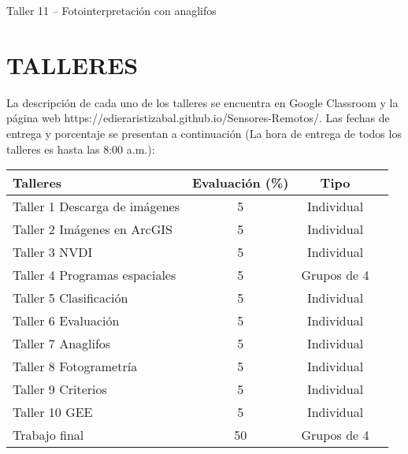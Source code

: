 \documentclass[a4paper,twoside,11pt,]{article}
\begin{document}
\begin{tcolorbox}[enhanced,width=5in,center upper,  fontupper=\large\bfseries,drop shadow southwest,sharp corners]
Taller 11 -- Fotointerpretación con anaglifos
\end{tcolorbox}

\section{TALLERES}
La descripción de cada uno de los talleres se encuentra en Google Classroom y la página web https://edieraristizabal.github.io/Sensores-Remotos/. Las fechas de entrega y porcentaje se presentan a continuación (La hora de entrega de todos los talleres es hasta las 8:00 a.m.):\\
\begin{table}[!hbt]
\label{tab-marks}
\begin{tabular}{|l|c|c|c|}
\hline {\bf Talleres} & {\bf Evaluación (\%)} & {\bf Tipo} \\
\hline Taller 1 Descarga de imágenes &  5 & Individual\\
\hline Taller 2 Imágenes en ArcGIS & 5 & Individual\\
\hline Taller 3 NVDI & 5 & Individual\\
\hline Taller 4 Programas espaciales &  5 & Grupos de 4\\
\hline Taller 5 Clasificación & 5 & Individual\\
\hline Taller 6 Evaluación & 5 & Individual\\
\hline Taller 7 Anaglifos &  5 & Individual\\
\hline Taller 8 Fotogrametría & 5 & Individual\\
\hline Taller 9 Criterios  & 5 & Individual\\
\hline Taller 10 GEE  & 5 & Individual\\
\hline Trabajo final & 50 & Grupos de 4\\
\hline
\end{tabular}
\end{table}
\end{document}
